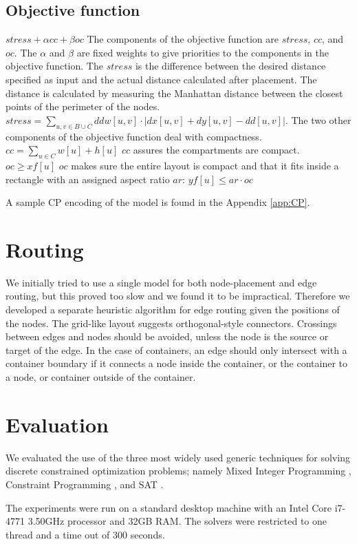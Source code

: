 \documentclass[a4paper,11pt,phdthesis,singlespace,twoside]{cssethesis}
\begin{document}
		\subsection{Objective function}
$stress + \alpha cc + \beta oc$
The components of the objective function are $stress$, $cc$, and $oc$. The $\alpha$ and $\beta$ are fixed weights to give priorities to the components in the objective function.
The $stress$ is the difference between the desired distance specified as input and the actual distance calculated after placement. The distance is calculated by measuring the Manhattan distance between the closest points of the perimeter of the nodes.
$stress = \sum_{u,v \in B \cup C} ddw[u,v] \cdot  | dx[u,v]+dy[u,v]-dd[u,v] |.$
The two other components of the objective function deal with compactness. 
$cc = \sum_{u \in C} w[u] + h[u]$
$cc$ assures the compartments are compact.
$oc \ge xf[u]$
$oc$ makes sure the entire layout is compact and that it fits inside a rectangle with an assigned aspect ratio 
$ar$: $yf[u] \le ar \cdot oc$

A sample CP encoding of the model is found in the Appendix \ref{app:CP}.

\section{Routing}
We initially tried to use a single model for both node-placement and edge routing, but this proved too slow and we found it to be impractical. Therefore we developed a separate heuristic algorithm for edge routing given the positions of the nodes.
The grid-like layout suggests orthogonal-style connectors. Crossings between edges and nodes should be avoided, unless the node is the source or target of the edge. In the case of containers, an edge should only intersect with a container boundary if it connects a node inside the container, or the container to a node, or container outside of the container.

\section{Evaluation}
We evaluated the use of the three most widely used generic techniques for solving discrete constrained optimization problems; namely Mixed Integer Programming \cite{MILPcom}, Constraint Programming \cite{CPcom}, and SAT \cite{codish2008logic}.

The experiments were run on a standard desktop machine with an Intel Core i7-4771 3.50GHz processor and 32GB RAM. The solvers were restricted to one thread and a time out of 300 seconds. 
\end{document}
